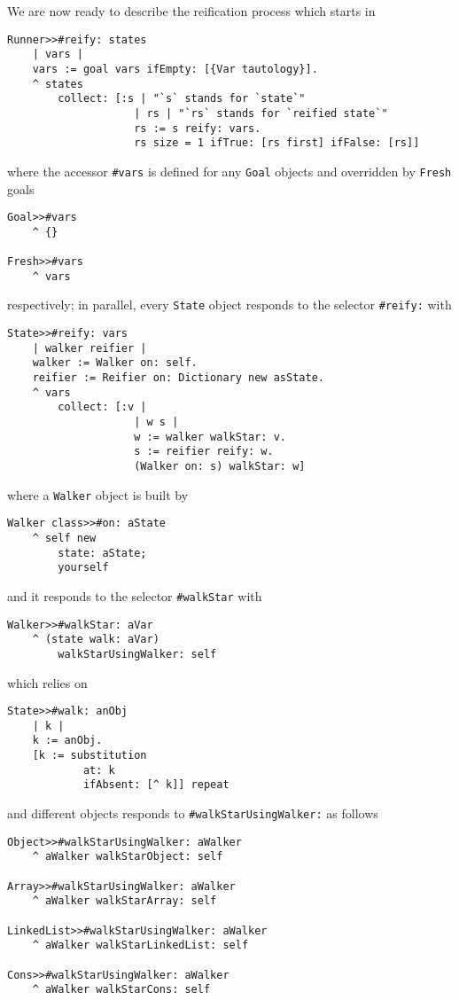 \documentclass[a4paper,12pt]{article}
\begin{document}
We are now ready to describe the reification process which starts in
\begin{verbatim}
Runner>>#reify: states 
    | vars |
    vars := goal vars ifEmpty: [{Var tautology}].
    ^ states
        collect: [:s | "`s` stands for `state`"
                    | rs | "`rs` stands for `reified state`"
                    rs := s reify: vars.
                    rs size = 1 ifTrue: [rs first] ifFalse: [rs]]
\end{verbatim}
where the accessor \Verb|#vars| is defined for any \Verb|Goal| objects and overridden by \Verb|Fresh| goals 
\begin{verbatim}
Goal>>#vars
    ^ {}

Fresh>>#vars
    ^ vars
\end{verbatim}
respectively; in parallel, every \Verb|State| object responds to the selector \Verb|#reify:| with
\begin{verbatim}
State>>#reify: vars 
    | walker reifier |
    walker := Walker on: self.
    reifier := Reifier on: Dictionary new asState.
    ^ vars
        collect: [:v | 
                    | w s |
                    w := walker walkStar: v.
                    s := reifier reify: w.
                    (Walker on: s) walkStar: w]
\end{verbatim}
where a \Verb|Walker| object is built by 
\begin{verbatim}
Walker class>>#on: aState
    ^ self new 
        state: aState;
        yourself
\end{verbatim}
and it responds to the selector \Verb|#walkStar| with
\begin{verbatim}
Walker>>#walkStar: aVar 
    ^ (state walk: aVar)
        walkStarUsingWalker: self
\end{verbatim}
which relies on 
\begin{verbatim}
State>>#walk: anObj 
    | k |
    k := anObj.
    [k := substitution
            at: k
            ifAbsent: [^ k]] repeat
\end{verbatim}
and different objects responds to \Verb|#walkStarUsingWalker:| as follows
\begin{verbatim}
Object>>#walkStarUsingWalker: aWalker
    ^ aWalker walkStarObject: self 

Array>>#walkStarUsingWalker: aWalker
    ^ aWalker walkStarArray: self

LinkedList>>#walkStarUsingWalker: aWalker
    ^ aWalker walkStarLinkedList: self 

Cons>>#walkStarUsingWalker: aWalker
    ^ aWalker walkStarCons: self 
\end{verbatim}
\end{document}
